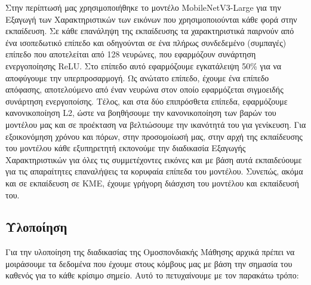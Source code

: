 Στην περίπτωσή μας χρησιμοποιήθηκε το μοντέλο MobileNetV3-Large για την Εξαγωγή των Χαρακτηριστικών των εικόνων που χρησιμοποιούνται κάθε φορά στην εκπαίδευση. Σε κάθε επανάληψη της εκπαίδευσης τα χαρακτηριστικά παιρνούν από ένα ισοπεδωτικό επίπεδο και οδηγούνται σε ένα πλήρως συνδεδεμένο (συμπαγές) επίπεδο που αποτελείται από 128 νευρώνες, που εφαρμόζουν συνάρτηση ενεργοποίησης ReLU. Στο επίπεδο αυτό εφαρμόζουμε εγκατάλειψη 50\% για να αποφύγουμε την υπερπροσαρμογή. Ως ανώτατο επίπεδο, έχουμε ένα επίπεδο απόφασης, αποτελούμενο από έναν νευρώνα στον οποίο εφαρμόζεται σιγμοειδής συνάρτηση ενεργοποίσης. Τέλος, και στα δύο επιπρόσθετα επίπεδα, εφαρμόζουμε κανονικοποίηση L2, ώστε να βοηθήσουμε την κανονικοποίηση των βαρών του μοντέλου μας και σε προέκταση να βελτιώσουμε την ικανότητά του για γενίκευση. Για εξοικονόμηση χρόνου και πόρων, στην προσομοίωσή μας, στην αρχή της εκπαίδευσης του μοντέλου κάθε εξυπηρετητή εκπονούμε την διαδικασία Εξαγωγής Χαρακτηριστικών για όλες τις συμμετέχοντες εικόνες και με βάση αυτά εκπαιδεύουμε για τις απαραίτητες επαναλήψεις τα κορυφαία επίπεδα του μοντέλου. Συνεπώς, ακόμα και σε εκπαίδευση σε ΚΜΕ, έχουμε γρήγορη διάσχιση του μοντέλου και εκπαίδευσή του.

\subsection{Υλοποίηση}

Για την υλοποίηση της διαδικασίας της Ομοσπονδιακής Μάθησης αρχικά πρέπει να μοιράσουμε τα δεδομένα που έχουμε στους κόμβους μας με βάση την σημασία του καθενός για το κάθε κρίσιμο σημείο. Αυτό το πετυχαίνουμε με τον παρακάτω τρόπο:

